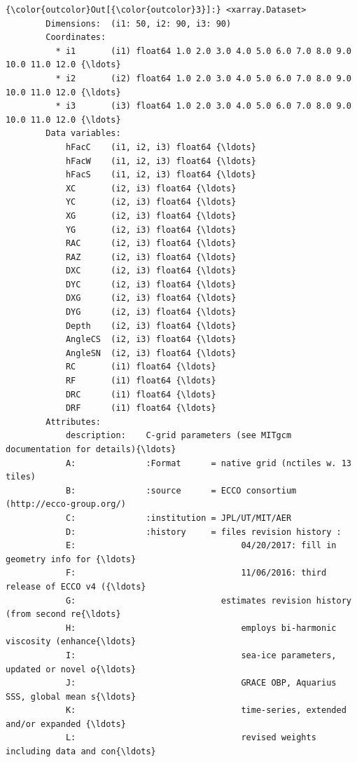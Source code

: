 \documentclass[11pt]{article}
\begin{document}
\begin{Verbatim}[commandchars=\\\{\}]
{\color{outcolor}Out[{\color{outcolor}3}]:} <xarray.Dataset>
        Dimensions:  (i1: 50, i2: 90, i3: 90)
        Coordinates:
          * i1       (i1) float64 1.0 2.0 3.0 4.0 5.0 6.0 7.0 8.0 9.0 10.0 11.0 12.0 {\ldots}
          * i2       (i2) float64 1.0 2.0 3.0 4.0 5.0 6.0 7.0 8.0 9.0 10.0 11.0 12.0 {\ldots}
          * i3       (i3) float64 1.0 2.0 3.0 4.0 5.0 6.0 7.0 8.0 9.0 10.0 11.0 12.0 {\ldots}
        Data variables:
            hFacC    (i1, i2, i3) float64 {\ldots}
            hFacW    (i1, i2, i3) float64 {\ldots}
            hFacS    (i1, i2, i3) float64 {\ldots}
            XC       (i2, i3) float64 {\ldots}
            YC       (i2, i3) float64 {\ldots}
            XG       (i2, i3) float64 {\ldots}
            YG       (i2, i3) float64 {\ldots}
            RAC      (i2, i3) float64 {\ldots}
            RAZ      (i2, i3) float64 {\ldots}
            DXC      (i2, i3) float64 {\ldots}
            DYC      (i2, i3) float64 {\ldots}
            DXG      (i2, i3) float64 {\ldots}
            DYG      (i2, i3) float64 {\ldots}
            Depth    (i2, i3) float64 {\ldots}
            AngleCS  (i2, i3) float64 {\ldots}
            AngleSN  (i2, i3) float64 {\ldots}
            RC       (i1) float64 {\ldots}
            RF       (i1) float64 {\ldots}
            DRC      (i1) float64 {\ldots}
            DRF      (i1) float64 {\ldots}
        Attributes:
            description:    C-grid parameters (see MITgcm documentation for details){\ldots}
            A:              :Format      = native grid (nctiles w. 13 tiles)
            B:              :source      = ECCO consortium (http://ecco-group.org/)
            C:              :institution = JPL/UT/MIT/AER
            D:              :history     = files revision history :
            E:                                 04/20/2017: fill in geometry info for {\ldots}
            F:                                 11/06/2016: third release of ECCO v4 ({\ldots}
            G:                             estimates revision history (from second re{\ldots}
            H:                                 employs bi-harmonic viscosity (enhance{\ldots}
            I:                                 sea-ice parameters, updated or novel o{\ldots}
            J:                                 GRACE OBP, Aquarius SSS, global mean s{\ldots}
            K:                                 time-series, extended and/or expanded {\ldots}
            L:                                 revised weights including data and con{\ldots}

\end{Verbatim}
\end{document}
